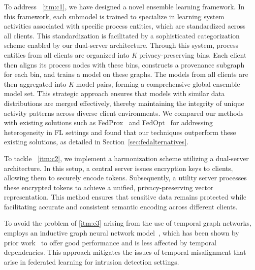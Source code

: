 To address ~\ref{itm:c1}, we have designed a novel ensemble learning framework. In this framework, each submodel is trained to specialize in learning system activities associated with specific process entities, which are standardized across all clients. This standardization is facilitated by a sophisticated categorization scheme enabled by our dual-server architecture. Through this system, process entities from all clients are organized into \textit{K} privacy-preserving bins. Each client then aligns its process nodes with these bins, constructs a provenance subgraph for each bin, and trains a \gnnshort model on these graphs. The models from all clients are then aggregated into \textit{K} model pairs, forming a comprehensive global ensemble model set. This strategic approach ensures that models with similar data distributions are merged effectively, thereby maintaining the integrity of unique activity patterns across diverse client environments. We compared our methods with existing solutions such as FedProx~\cite{li2020federated} and FedOpt~\cite{asad2020fedopt} for addressing heterogeneity in FL settings and found that our techniques outperform these existing solutions, as detailed in Section~\ref{sec:fedalternatives}.

To tackle ~\ref{itm:c2}, we implement a \wordvec harmonization scheme utilizing a dual-server architecture. In this setup, a central server issues encryption keys to clients, allowing them to securely encode \wordvec tokens. Subsequently, a utility server processes these encrypted tokens to achieve a unified, privacy-preserving vector representation. This method ensures that sensitive data remains protected while facilitating accurate and consistent semantic encoding across different clients.

To avoid the problem of \ref{itm:c3} arising from the use of temporal graph networks, \Sys employs an inductive graph neural network model~\cite{hamilton2017inductive}, which has been shown by prior work~\cite{flash2024,shadewatcher,wang2022threatrace} to offer good performance and is less affected by temporal dependencies. This approach mitigates the issues of temporal misalignment that arise in federated learning for intrusion detection settings.

